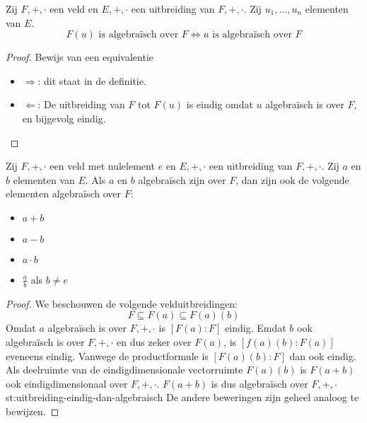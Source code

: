 \documentclass[main.tex]{subfiles}
\begin{document}
\begin{st}
\label{st:element-asa-uitbreiding-algebraisch}
  Zij $F,+,\cdot$ een veld en $E,+,\cdot$ een uitbreiding van $F,+,\cdot$.
  Zij $u_{1},\dotsc,u_{n}$ elementen van $E$.
  \[ F(u) \text{ is algebra\"isch over } F \Leftrightarrow u \text{ is algebra\"isch over } F \]

  \begin{proof}
    Bewijs van een equivalentie
    \begin{itemize}
    \item $\Rightarrow$: dit staat in de definitie.
    \item $\Leftarrow$: De uitbreiding van $F$ tot $F(u)$ is eindig omdat $u$ algebra\"isch is over $F$, en bijgevolg eindig.
    \end{itemize}
  \end{proof}
\end{st}

\begin{st}
  Zij $F,+,\cdot$ een veld met nulelement $e$ en $E,+,\cdot$ een uitbreiding van $F,+,\cdot$.
  Zij $a$ en $b$ elementen van $E$.
  Als $a$ en $b$ algebra\"isch zijn over $F$, dan zijn ook de volgende elementen algebra\"isch over $F$:
  \begin{itemize}
  \item $a+b$
  \item $a-b$
  \item $a\cdot b$
  \item $\frac{a}{b}$ als $b \neq e$
  \end{itemize}

  \begin{proof}
    We beschouwen de volgende velduitbreidingen:
    \[
    F \subseteq F(a) \subseteq F(a)(b)
    \]
    Omdat $a$ algebra\"isch is over $F,+,\cdot$ is $[F(a):F]$ eindig.
    Emdat $b$ ook algebra\"isch is over $F,+,\cdot$ en dus zeker over $F(a)$, is $[f(a)(b):F(a)]$ eveneens eindig.
    Vanwege de productformule is $[F(a)(b):F]$ dan ook eindig.
    Als deelruimte van de eindigdimensionale vectorruimte $F(a)(b)$ is $F(a+b)$ ook eindigdimensionaal over $F,+,\cdot$. $F(a+b)$ is dus algebra\"isch over $F,+,\cdot$ {st:uitbreiding-eindig-dan-algebraisch}
    De andere beweringen zijn geheel analoog te bewijzen.
  \end{proof}
\end{st}
\end{document}
